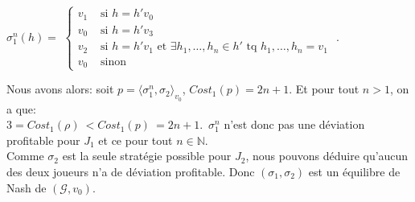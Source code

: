 \begin{exemple}
\begin{demonstration}
$\sigma _{1}^{n}(h) = $ $\begin{cases}
					 v_{1} & \text{ si } h = h'v_{0}\\
					 v_{0} & \text{ si } h = h'v_{3}\\
					 v_{2} & \text{ si } h = h'v_{1} \text{ et } \exists h_{1},\ldots,h_{n} \in h' \text{ tq } h_{1},\ldots,h_{n} = v_{1} \\
					v_{0} & \text{ sinon}
					
					\end{cases}$ .
					
\noindent Nous avons alors: soit $ p = \langle \sigma _{1}^{n},\sigma _{2} \rangle_{v_0}$, $Cost_{1}(p) = 2n+1$. Et pour tout $n > 1$, on a que: \\\mbox{$3=Cost_{1}(\rho)~< Cost_{1}(p)~= 2n +1$. $\sigma _{1}^{n}$} n'est donc pas une déviation profitable pour $J_{1}$ et ce pour tout $n \in  \mathbb{N}$.\\

Comme $\sigma _{2}$ est la seule stratégie possible pour $J_{2}$, nous pouvons déduire qu'aucun des deux joueurs n'a de déviation profitable. Donc $(\sigma _{1}, \sigma _{2})$ est un équilibre de Nash de $(\mathcal{G},v_{0})$.

\end{demonstration}			 		
    
\end{exemple}



